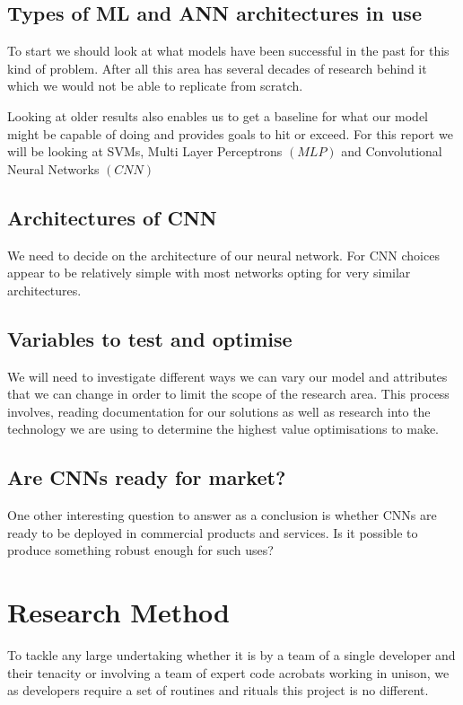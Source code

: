 \subsection{Types of ML and ANN architectures in use}
To start we should look at what models have been successful in the past for this kind of problem. After all this area has several decades of research behind it which we would not be able to replicate from scratch.

Looking at older results also enables us to get a baseline for what our model might be capable of doing and provides goals to hit or exceed. For this report we will be looking at SVMs, Multi Layer Perceptrons $\left(MLP\right)$ and Convolutional Neural Networks $\left(CNN\right)$

\subsection{Architectures of CNN}
We need to decide on the architecture of our neural network. For CNN choices appear to be relatively simple with most networks opting for very similar architectures.

\subsection{Variables to test and optimise}
We will need to investigate different ways we can vary our model and attributes that we can change in order to limit the scope of the research area. This process involves, reading documentation for our solutions as well as research into the technology we are using to determine the highest value optimisations to make.

\subsection{Are CNNs ready for market?}
One other interesting question to answer as a conclusion is whether CNNs are ready to be deployed in commercial products and services. Is it possible to produce something robust enough for such uses?

\section{Research Method}
To tackle any large undertaking whether it is by a team of a single developer and their tenacity or involving a team of expert code acrobats working in unison, we as developers require a set of routines and rituals this project is no different.

